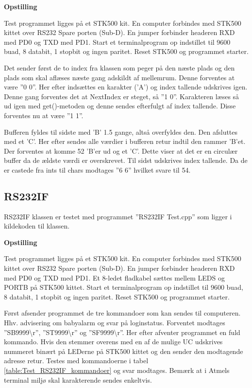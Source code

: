 \textbf{Opstilling}

Test programmet ligges på et STK500 kit.
En computer forbindes med STK500 kittet over RS232 Spare porten (Sub-D).
En jumper forbinder headeren RXD med PD0 og TXD med PD1.
Start et terminalprogram op indstillet til 9600 buad, 8 databit, 1 stopbit og ingen paritet.
Reset STK500 og programmet starter.

Det sender først de to index fra klassen som peger på den næste plads og den plads som skal aflæses næste gang adskildt af mellemrum.
Denne forventes at være ''0 0''. Her efter indsættes en karakter ('A') og index tallende udskrives igen. Denne gang forventes det at NextIndex er steget, så ''1 0''. Karakteren læses så ud igen med get()-metoden og denne sendes efterfulgt af index tallende. Disse forventes nu at være ''1 1''.

Bufferen fyldes til sidste med 'B' 1.5 gange, altså overfyldes den. Den afsluttes med et 'C'. Her efter sendes alle værdier i bufferen retur indtil den rammer 'B'et. Der forventes at komme 52 'B'er ud og et 'C'. Dette viser at det er en circulær buffer da de ældste værdi er overskrevet.
Til sidst udskrives index tallende. Da de er castede fra ints til chars modtages ''6 6'' hvilket svare til 54.

\subsection{RS232IF}
RS232IF klassen er testet med programmet ''RS232IF Test.cpp'' som ligger i kildekoden til klassen.

\textbf{Opstilling}

Test programmet ligges på et STK500 kit.
En computer forbindes med STK500 kittet over RS232 Spare porten (Sub-D).
En jumper forbinder headeren RXD med PD0 og TXD med PD1. Et 8-ledet fladkabel sættes mellem LEDS og PORTB på STK500 kittet.
Start et terminalprogram op indstillet til 9600 buad, 8 databit, 1 stopbit og ingen paritet.
Reset STK500 og programmet starter.

Først afsender programmet de tre kommandoer som kan sendes til computeren. Hhv. advisering om babyalarm og svar på loginstatus.
Forventet modtages ''SB9999\textbackslash r'', ''ST9999\textbackslash r'' og ''SF9999\textbackslash r''.
Her efter afventer programmet en fuld kommando. Hvis den stemmer overens med en af de mulige UC udskrives nummeret binært på LEDerne på STK500 kittet og den sender den modtagende adresse retur.
Testes med kommandoerne i tabel \ref{table:Test_RS232IF_kommandoer} og svar modtages. Bemærk at i Atmels terminal miljø skal karakterende sendes enkeltvis.

